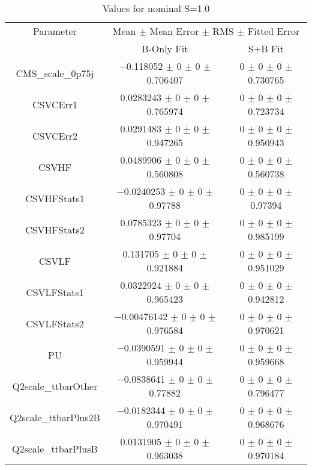 \begin{table}
\centering
\caption{Values for nominal S=1.0}
\begin{tabular}{ccc}
\toprule
Parameter & \multicolumn{2}{c}{Mean $\pm$ Mean Error $\pm$ RMS $\pm$ Fitted Error}\\
 & B-Only Fit & S+B Fit\\
\midrule
CMS\_scale\_0p75j & \num{-0.118052} $\pm$ \num{0} $\pm$ \num{0} $\pm$ \num{0.706407} & \num{0} $\pm$ \num{0} $\pm$ \num{0} $\pm$ \num{0.730765}\\
CSVCErr1 & \num{0.0283243} $\pm$ \num{0} $\pm$ \num{0} $\pm$ \num{0.765974} & \num{0} $\pm$ \num{0} $\pm$ \num{0} $\pm$ \num{0.723734}\\
CSVCErr2 & \num{0.0291483} $\pm$ \num{0} $\pm$ \num{0} $\pm$ \num{0.947265} & \num{0} $\pm$ \num{0} $\pm$ \num{0} $\pm$ \num{0.950943}\\
CSVHF & \num{0.0489906} $\pm$ \num{0} $\pm$ \num{0} $\pm$ \num{0.560808} & \num{0} $\pm$ \num{0} $\pm$ \num{0} $\pm$ \num{0.560738}\\
CSVHFStats1 & \num{-0.0240253} $\pm$ \num{0} $\pm$ \num{0} $\pm$ \num{0.97788} & \num{0} $\pm$ \num{0} $\pm$ \num{0} $\pm$ \num{0.97394}\\
CSVHFStats2 & \num{0.0785323} $\pm$ \num{0} $\pm$ \num{0} $\pm$ \num{0.97704} & \num{0} $\pm$ \num{0} $\pm$ \num{0} $\pm$ \num{0.985199}\\
CSVLF & \num{0.131705} $\pm$ \num{0} $\pm$ \num{0} $\pm$ \num{0.921884} & \num{0} $\pm$ \num{0} $\pm$ \num{0} $\pm$ \num{0.951029}\\
CSVLFStats1 & \num{0.0322924} $\pm$ \num{0} $\pm$ \num{0} $\pm$ \num{0.965423} & \num{0} $\pm$ \num{0} $\pm$ \num{0} $\pm$ \num{0.942812}\\
CSVLFStats2 & \num{-0.00476142} $\pm$ \num{0} $\pm$ \num{0} $\pm$ \num{0.976584} & \num{0} $\pm$ \num{0} $\pm$ \num{0} $\pm$ \num{0.970621}\\
PU & \num{-0.0390591} $\pm$ \num{0} $\pm$ \num{0} $\pm$ \num{0.959944} & \num{0} $\pm$ \num{0} $\pm$ \num{0} $\pm$ \num{0.959668}\\
Q2scale\_ttbarOther & \num{-0.0838641} $\pm$ \num{0} $\pm$ \num{0} $\pm$ \num{0.77882} & \num{0} $\pm$ \num{0} $\pm$ \num{0} $\pm$ \num{0.796477}\\
Q2scale\_ttbarPlus2B & \num{-0.0182344} $\pm$ \num{0} $\pm$ \num{0} $\pm$ \num{0.970491} & \num{0} $\pm$ \num{0} $\pm$ \num{0} $\pm$ \num{0.968676}\\
Q2scale\_ttbarPlusB & \num{0.0131905} $\pm$ \num{0} $\pm$ \num{0} $\pm$ \num{0.963038} & \num{0} $\pm$ \num{0} $\pm$ \num{0} $\pm$ \num{0.970184}\\

\end{tabular}
\end{table}
